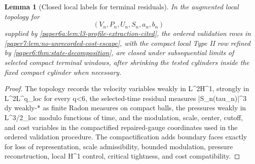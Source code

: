 \documentclass[11pt]{amsart}
\def\({}%
\def\){}%
\def\tau{tau}%
\theoremstyle{plain}
\newtheorem{lemma}[lemma]{Lemma}
\theoremstyle{definition}
\theoremstyle{remark}
\begin{document}
\begin{lemma}[Closed local labels for terminal residuals]
\label{paper6a:lem:critical-mass-decoupling}
In the augmented local topology for
\[
  (V_n,P_n,U_n,S_n,a_n,b_n)
\]
supplied by \cref{paper6a:lem:l3-profile-extraction-cited}, the ordered
validation rows in \cref{paper7:lem:no-unrecorded-cost-escape}, with the compact
local Type II row refined by \cref{paper6:thm:state-decomposition}, are closed
under subsequential limits of selected compact terminal windows, after shrinking
the tested cylinders inside the fixed compact cylinder when necessary.
\end{lemma}

\begin{proof}
The topology records the velocity variables weakly in \(L^2H^1\), strongly in
\(L^2L^q_{\rm loc}\) for every \(q<6\), the selected-time residual measures
\(|S_n(\tau_n)|^3\,dy\) weakly-\(*\) as finite Radon measures on compact balls,
the pressures weakly in \(L^{3/2}_{\rm loc}\) modulo functions of time, and the
modulation, scale, center, cutoff, and cost variables in the compactified
repaired-gauge coordinates used in the ordered validation procedure.  The
compactification adds boundary faces exactly for loss of representation, scale
admissibility, bounded modulation, pressure reconstruction, local \(H^1\)
control, critical tightness, and cost compatibility.


\end{proof}
\end{document}
